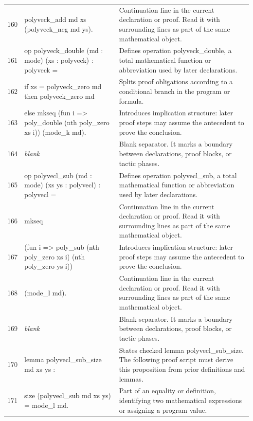 \documentclass[10pt]{article}
\begin{document}
\begin{longtable}{r L{0.53\textwidth} L{0.37\textwidth}}
160 & {\ttfamily\scriptsize   polyveck\_add md xs (polyveck\_neg md ys).} & Continuation line in the current declaration or proof.  Read it with surrounding lines as part of the same mathematical object. \\
161 & {\ttfamily\scriptsize op polyveck\_double (md : mode) (xs : polyveck) : polyveck =} & Defines operation polyveck\_double, a total mathematical function or abbreviation used by later declarations. \\
162 & {\ttfamily\scriptsize   if xs = polyveck\_zero md then polyveck\_zero md} & Splits proof obligations according to a conditional branch in the program or formula. \\
163 & {\ttfamily\scriptsize   else mkseq (fun i => poly\_double (nth poly\_zero xs i)) (mode\_k md).} & Introduces implication structure: later proof steps may assume the antecedent to prove the conclusion. \\
164 & {\ttfamily\scriptsize \emph{blank}} & Blank separator.  It marks a boundary between declarations, proof blocks, or tactic phases. \\
165 & {\ttfamily\scriptsize op polyvecl\_sub (md : mode) (xs ys : polyvecl) : polyvecl =} & Defines operation polyvecl\_sub, a total mathematical function or abbreviation used by later declarations. \\
166 & {\ttfamily\scriptsize   mkseq} & Continuation line in the current declaration or proof.  Read it with surrounding lines as part of the same mathematical object. \\
167 & {\ttfamily\scriptsize     (fun i => poly\_sub (nth poly\_zero xs i) (nth poly\_zero ys i))} & Introduces implication structure: later proof steps may assume the antecedent to prove the conclusion. \\
168 & {\ttfamily\scriptsize     (mode\_l md).} & Continuation line in the current declaration or proof.  Read it with surrounding lines as part of the same mathematical object. \\
169 & {\ttfamily\scriptsize \emph{blank}} & Blank separator.  It marks a boundary between declarations, proof blocks, or tactic phases. \\
170 & {\ttfamily\scriptsize lemma polyvecl\_sub\_size md xs ys :} & States checked lemma polyvecl\_sub\_size.  The following proof script must derive this proposition from prior definitions and lemmas. \\
171 & {\ttfamily\scriptsize   size (polyvecl\_sub md xs ys) = mode\_l md.} & Part of an equality or definition, identifying two mathematical expressions or assigning a program value. \\

\end{longtable}
\end{document}
